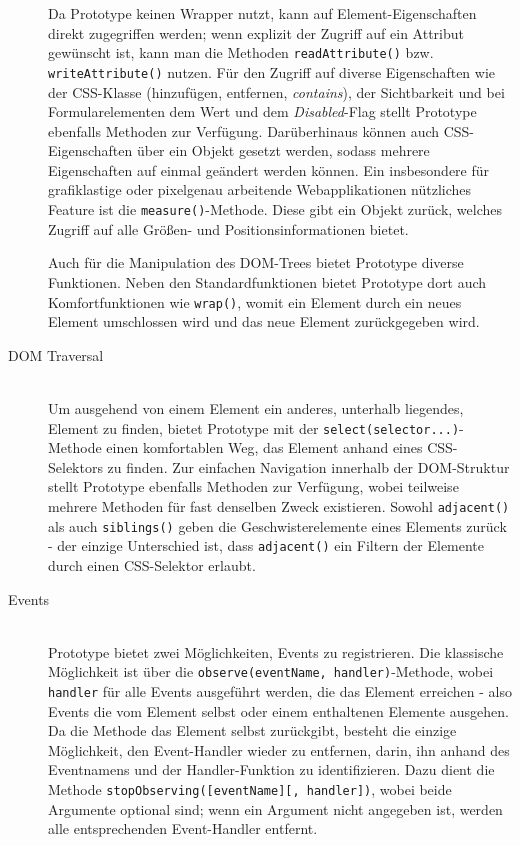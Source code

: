 \begin{description}
Da Prototype keinen Wrapper nutzt, kann auf Element-Eigenschaften direkt zugegriffen werden; wenn
explizit der Zugriff auf ein Attribut gewünscht ist, kann man die Methoden
\lstinline{readAttribute()} bzw. \lstinline{writeAttribute()} nutzen. Für den Zugriff auf diverse
Eigenschaften wie der CSS-Klasse (hinzufügen, entfernen, \emph{contains}), der Sichtbarkeit und bei
Formularelementen dem Wert und dem \emph{Disabled}-Flag  stellt Prototype ebenfalls Methoden zur
Verfügung. Darüberhinaus können auch CSS-Eigenschaften über ein Objekt gesetzt werden, sodass
mehrere Eigenschaften auf einmal geändert werden können. Ein insbesondere für grafiklastige oder
pixelgenau arbeitende Webapplikationen nützliches Feature ist die \lstinline{measure()}-Methode.
Diese gibt ein Objekt zurück, welches Zugriff auf alle Größen- und Positionsinformationen bietet.

Auch für die Manipulation des DOM-Trees bietet Prototype diverse Funktionen. Neben den
Standardfunktionen bietet Prototype dort auch Komfortfunktionen wie \lstinline{wrap()}, womit ein
Element durch ein neues Element umschlossen wird und das neue Element zurückgegeben wird.

\item[DOM Traversal] \hfill \\
Um ausgehend von einem Element ein anderes, unterhalb liegendes, Element zu finden, bietet Prototype
mit der \lstinline{select(selector...)}-Methode einen komfortablen Weg, das Element anhand eines
CSS-Selektors zu finden. Zur einfachen Navigation innerhalb der DOM-Struktur stellt Prototype
ebenfalls Methoden zur Verfügung, wobei teilweise mehrere Methoden für fast denselben Zweck
existieren. Sowohl \lstinline{adjacent()} als auch \lstinline{siblings()} geben die
Geschwisterelemente eines Elements zurück - der einzige Unterschied ist, dass \lstinline{adjacent()}
ein Filtern der Elemente durch einen CSS-Selektor erlaubt.

\item[Events] \hfill \\
Prototype bietet zwei Möglichkeiten, Events zu registrieren. Die klassische Möglichkeit ist über die
\lstinline{observe(eventName, handler)}-Methode, wobei \lstinline{handler} für alle Events
ausgeführt werden, die das Element erreichen - also Events die vom Element selbst oder einem
enthaltenen Elemente ausgehen. Da die Methode das Element selbst zurückgibt, besteht die einzige
Möglichkeit, den Event-Handler wieder zu entfernen, darin, ihn anhand des Eventnamens und der
Handler-Funktion zu identifizieren. Dazu dient die Methode
\lstinline{stopObserving([eventName][, handler])}, wobei beide Argumente optional sind; wenn
ein Argument nicht angegeben ist, werden alle entsprechenden Event-Handler entfernt.


\end{description}
